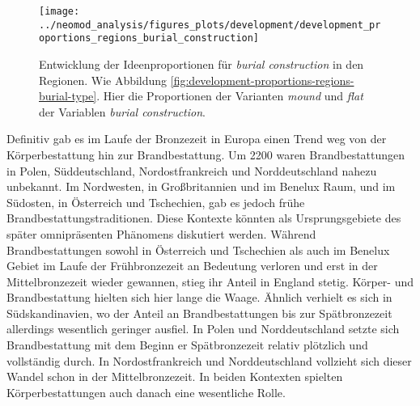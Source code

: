 \documentclass[openany,twoside,twocolumn]{book}
\begin{document}
\begin{figure}[!t]

{\centering \texttt{[image: ../neomod\_analysis/figures\_plots/development/development\_proportions\_regions\_burial\_construction]} 

}

\caption[Entwicklung der Ideenproportionen für \textit{burial construction} in den Regionen]{Entwicklung der Ideenproportionen für \textit{burial construction} in den Regionen. Wie Abbildung \ref{fig:development-proportions-regions-burial-type}. Hier die Proportionen der Varianten \textit{mound} und \textit{flat} der Variablen \textit{burial construction}.}\label{fig:development-proportions-regions-burial-construction}
\end{figure}

Definitiv gab es im Laufe der Bronzezeit in Europa einen Trend weg von
der Körperbestattung hin zur Brandbestattung. Um 2200 waren
Brandbestattungen in Polen, Süddeutschland, Nordostfrankreich und
Norddeutschland nahezu unbekannt. Im Nordwesten, in Großbritannien und
im Benelux Raum, und im Südosten, in Österreich und Tschechien, gab es
jedoch frühe Brandbestattungstraditionen. Diese Kontexte könnten als
Ursprungsgebiete des später omnipräsenten Phänomens diskutiert werden.
Während Brandbestattungen sowohl in Österreich und Tschechien als auch
im Benelux Gebiet im Laufe der Frühbronzezeit an Bedeutung verloren und
erst in der Mittelbronzezeit wieder gewannen, stieg ihr Anteil in
England stetig. Körper- und Brandbestattung hielten sich hier lange die
Waage. Ähnlich verhielt es sich in Südskandinavien, wo der Anteil an
Brandbestattungen bis zur Spätbronzezeit allerdings wesentlich geringer
ausfiel. In Polen und Norddeutschland setzte sich Brandbestattung mit
dem Beginn er Spätbronzezeit relativ plötzlich und vollständig durch. In
Nordostfrankreich und Norddeutschland vollzieht sich dieser Wandel schon
in der Mittelbronzezeit. In beiden Kontexten spielten Körperbestattungen
auch danach eine wesentliche Rolle.
\end{document}
